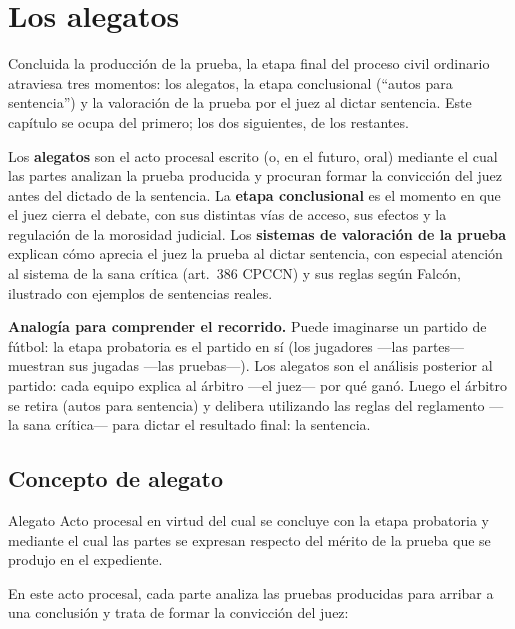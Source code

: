 \documentclass[12pt,oneside]{book}
\begin{document}
\chapter{Los alegatos}\label{cap:alegatos}

Concluida la producción de la prueba, la etapa final del proceso civil ordinario atraviesa tres momentos: los alegatos, la etapa conclusional (``autos para sentencia'') y la valoración de la prueba por el juez al dictar sentencia. Este capítulo se ocupa del primero; los dos siguientes, de los restantes.

Los \textbf{alegatos} son el acto procesal escrito (o, en el futuro, oral) mediante el cual las partes analizan la prueba producida y procuran formar la convicción del juez antes del dictado de la sentencia. La \textbf{etapa conclusional} es el momento en que el juez cierra el debate, con sus distintas vías de acceso, sus efectos y la regulación de la morosidad judicial. Los \textbf{sistemas de valoración de la prueba} explican cómo aprecia el juez la prueba al dictar sentencia, con especial atención al sistema de la sana crítica (art.~386 CPCCN) y sus reglas según Falcón, ilustrado con ejemplos de sentencias reales.

\begin{note}
\textbf{Analogía para comprender el recorrido.} Puede imaginarse un partido de fútbol: la etapa probatoria es el partido en sí (los jugadores ---las partes--- muestran sus jugadas ---las pruebas---). Los alegatos son el análisis posterior al partido: cada equipo explica al árbitro ---el juez--- por qué ganó. Luego el árbitro se retira (autos para sentencia) y delibera utilizando las reglas del reglamento ---la sana crítica--- para dictar el resultado final: la sentencia.
\end{note}

\section{Concepto de alegato}

\begin{definition}{Alegato}
Acto procesal en virtud del cual se concluye con la etapa probatoria y mediante el cual las partes se expresan respecto del mérito de la prueba que se produjo en el expediente.
\end{definition}

En este acto procesal, cada parte analiza las pruebas producidas para arribar a una conclusión y trata de formar la convicción del juez:
\end{document}
